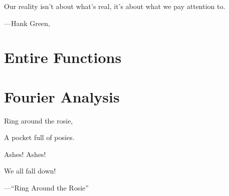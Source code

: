 \documentclass[openany]{book}
\begin{document}
\epigraph{Our reality isn't about what's real, it's about what we pay attention to.}
{---Hank Green, \cite{beautiful-endeavor}}



\chapter{Entire Functions}



\chapter{Fourier Analysis}
\epigraph{Ring around the rosie,

A pocket full of posies.

Ashes! Ashes!

We all fall down!}{---``Ring Around the Rosie''}



\nirprintbib
\nirprintindex
\end{document}
